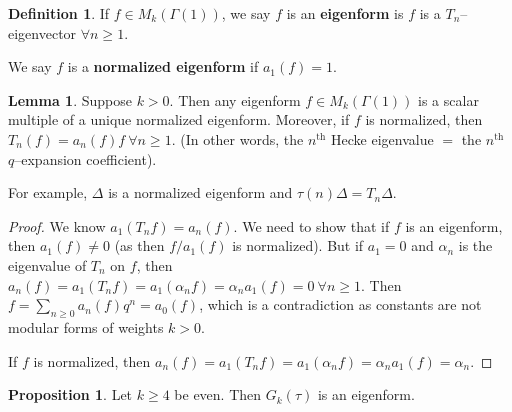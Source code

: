 \documentclass{article}
\theoremstyle{definition}
\newtheorem{lemma}[theorem]{Lemma}
\newtheorem{prop}[theorem]{Proposition}
\newtheorem{defn}{Definition}[section]
\begin{document}
\begin{defn}
    If $f \in M_k(\Gamma(1))$, we say $f$ is an \textbf{eigenform} is $f$ is a $T_n$--eigenvector $\forall n\ge 1$.
    \vspace{1mm}
     
    We say $f$ is a \textbf{normalized eigenform} if $a_1(f) = 1$.
\end{defn}
\begin{lemma}
    Suppose $k>0$. Then any eigenform $f \in M_k(\Gamma(1))$ is a scalar multiple of a unique normalized eigenform. Moreover, if $f$ is normalized, then $T_n(f) = a_n(f)f ~\forall n\ge 1$. (In other words, the $n^{\text{th}}$ Hecke eigenvalue $=$ the $n^{\text{th}}$ $q$--expansion coefficient).
\end{lemma}
For example, $\Delta$ is a normalized eigenform and $\tau(n)\Delta = T_n \Delta$.
\begin{proof}
    We know $a_1(T_n f) = a_n(f)$. We need to show that if $f$ is an eigenform, then $a_1(f) \neq 0$ (as then $f/a_1(f)$ is normalized). But if $a_1 = 0$ and $\alpha_n$ is the eigenvalue of $T_n$ on $f$, then $a_n(f) = a_1(T_n f) = a_1 (\alpha_n f) = \alpha_n a_1(f) = 0~\forall n\ge 1$. Then $f = \sum_{n\ge 0}^{} a_n(f) q^n = a_0(f)$, which is a contradiction as constants are not modular forms of weights $k>0$.
    \vspace{1mm}
     
    If $f$ is normalized, then $a_n(f) = a_1(T_n f) = a_1(\alpha_n f) = \alpha_n a_1(f) = \alpha_n$.
\end{proof}
\begin{prop}
    Let $k\ge 4$ be even. Then $G_k(\tau)$ is an eigenform.
\end{prop}
\end{document}
